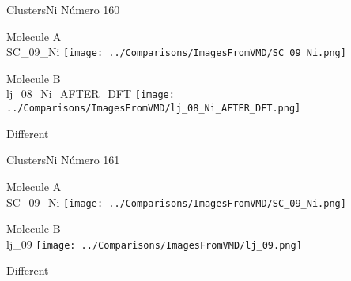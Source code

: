  \newpage

\vtab[-3cm]
\begin{center}
{\large ClustersNi \tab Número 160}
\end{center}
\begin{multicols}{2}
\begin{center}
Molecule A \\ 
SC\_09\_Ni
\texttt{[image: ../Comparisons/ImagesFromVMD/SC\_09\_Ni.png]}
\\
\vtab

\columnbreak
Molecule B \\ 
lj\_08\_Ni\_AFTER\_DFT
\texttt{[image: ../Comparisons/ImagesFromVMD/lj\_08\_Ni\_AFTER\_DFT.png]}
\\
\vtab


\end{center}
\end{multicols}
\begin{center}
\textcolor{NavyBlue}{\Large Different}
\end{center}

 \newpage

\vtab[-3cm]
\begin{center}
{\large ClustersNi \tab Número 161}
\end{center}
\begin{multicols}{2}
\begin{center}
Molecule A \\ 
SC\_09\_Ni
\texttt{[image: ../Comparisons/ImagesFromVMD/SC\_09\_Ni.png]}
\\
\vtab

\columnbreak
Molecule B \\ 
lj\_09
\texttt{[image: ../Comparisons/ImagesFromVMD/lj\_09.png]}
\\
\vtab


\end{center}
\end{multicols}
\begin{center}
\textcolor{NavyBlue}{\Large Different}
\end{center}

 \newpage

